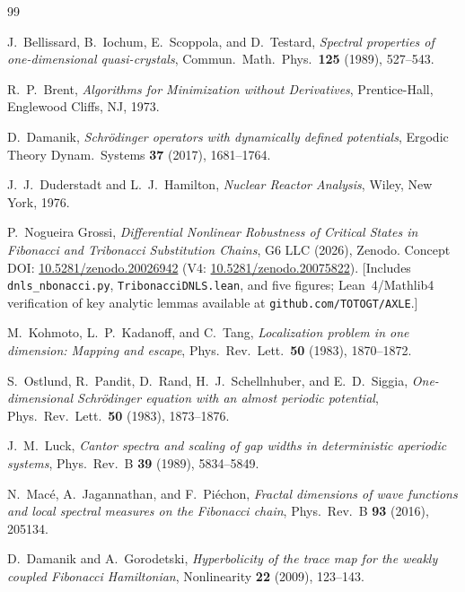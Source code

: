 \documentclass[11pt]{article}
\begin{document}
\begin{thebibliography}{99}

J.~Bellissard, B.~Iochum, E.~Scoppola, and D.~Testard,
\textit{Spectral properties of one-dimensional quasi-crystals},
Commun.\ Math.\ Phys.\ \textbf{125} (1989), 527--543.

R.~P.~Brent,
\textit{Algorithms for Minimization without Derivatives},
Prentice-Hall, Englewood Cliffs, NJ, 1973.

D.~Damanik,
\textit{Schr\"{o}dinger operators with dynamically defined potentials},
Ergodic Theory Dynam.\ Systems \textbf{37} (2017), 1681--1764.

J.~J.~Duderstadt and L.~J.~Hamilton,
\textit{Nuclear Reactor Analysis},
Wiley, New York, 1976.

P.~Nogueira Grossi,
\textit{Differential Nonlinear Robustness of Critical States in
Fibonacci and Tribonacci Substitution Chains},
G6 LLC (2026), Zenodo.
Concept DOI: \href{https://doi.org/10.5281/zenodo.20026942}{10.5281/zenodo.20026942}
(V4: \href{https://doi.org/10.5281/zenodo.20075822}{10.5281/zenodo.20075822}).
[Includes \texttt{dnls\_nbonacci.py}, \texttt{TribonacciDNLS.lean},
and five figures; Lean~4/Mathlib4 verification of key analytic lemmas
available at \texttt{github.com/TOTOGT/AXLE}.]

M.~Kohmoto, L.~P.~Kadanoff, and C.~Tang,
\textit{Localization problem in one dimension: Mapping and escape},
Phys.\ Rev.\ Lett.\ \textbf{50} (1983), 1870--1872.

S.~Ostlund, R.~Pandit, D.~Rand, H.~J.~Schellnhuber, and E.~D.~Siggia,
\textit{One-dimensional Schr\"{o}dinger equation with an almost periodic potential},
Phys.\ Rev.\ Lett.\ \textbf{50} (1983), 1873--1876.

J.~M.~Luck,
\textit{Cantor spectra and scaling of gap widths in deterministic aperiodic systems},
Phys.\ Rev.\ B \textbf{39} (1989), 5834--5849.

N.~Mac\'{e}, A.~Jagannathan, and F.~Pi\'{e}chon,
\textit{Fractal dimensions of wave functions and local spectral measures
on the Fibonacci chain},
Phys.\ Rev.\ B \textbf{93} (2016), 205134.

D.~Damanik and A.~Gorodetski,
\textit{Hyperbolicity of the trace map for the weakly coupled Fibonacci Hamiltonian},
Nonlinearity \textbf{22} (2009), 123--143.


\end{thebibliography}
\end{document}
